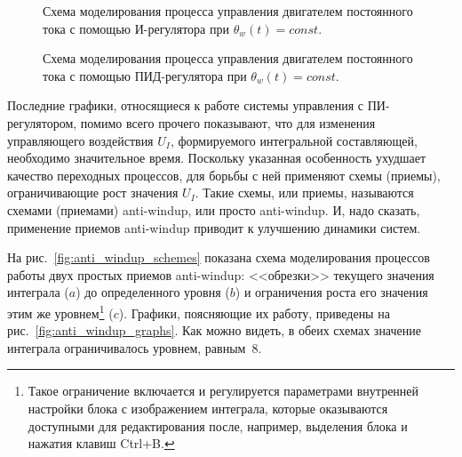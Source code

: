 \documentclass[12pt,a4paper,openany]{extarticle}
\begin{document}
\begin{landscape}
\thispagestyle{empty}
\begin{figure}[h!]
	\caption{Схема моделирования процесса управления двигателем постоянного тока с помощью И-регулятора при $\theta_w(t) = const$.}
	\label{fig:I_regul_scheme}
\end{figure}	

\begin{figure}[h!]
	\caption{Схема моделирования процесса управления двигателем постоянного тока с помощью ПИД-регулятора при $\theta_w(t) = const$.}
	\label{fig:PID_regul_scheme}
\end{figure}	

\end{landscape}

Последние графики, относящиеся к работе системы управления с ПИ-регулятором, помимо всего прочего показывают, что для изменения управляющего воздействия $U_I$, формируемого интегральной составляющей, необходимо значительное время.
Поскольку указанная особенность ухудшает качество переходных процессов, для борьбы с ней применяют схемы (приемы), ограничивающие рост значения $U_I$.
Такие схемы, или приемы, называются схемами (приемами) anti-windup, или просто anti-windup.
И, надо сказать, применение приемов anti-windup приводит к улучшению динамики систем.

На рис.~\ref{fig:anti_windup_schemes} показана схема моделирования процессов работы двух простых приемов anti-windup: <<обрезки>> текущего значения интеграла ($a$) до определенного уровня ($b$) и ограничения роста его значения этим же уровнем\footnote{Такое ограничение включается и регулируется параметрами внутренней настройки блока с изображением интеграла, которые оказываются доступными для редактирования после, например, выделения блока и нажатия клавиш Ctrl+B.} ($c$).
Графики, поясняющие их работу, приведены на рис.~\ref{fig:anti_windup_graphs}.
Как можно видеть, в обеих схемах значение интеграла ограничивалось уровнем, равным~$8$.
\end{document}
